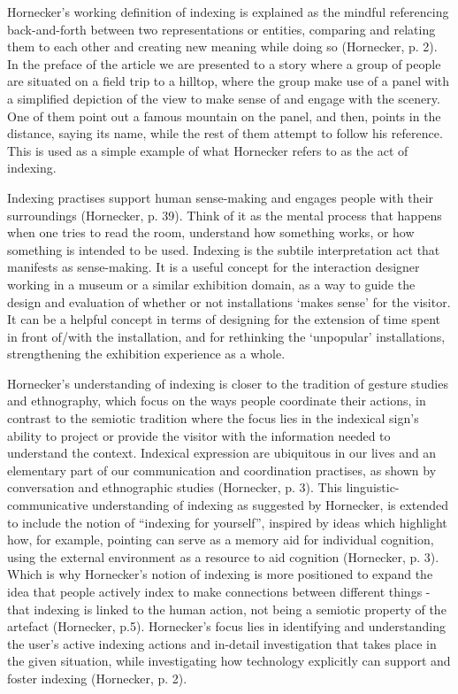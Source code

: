 Hornecker’s working definition of indexing is explained as the mindful referencing back-and-forth between two representations or entities, comparing and relating them to each other and creating new meaning while doing so (Hornecker, p. 2). In the preface of the article we are presented to a story where a group of people are situated on a field trip to a hilltop, where the group make use of a panel with a simplified depiction of the view to make sense of and engage with the scenery. One of them point out a famous mountain on the panel, and then, points in the distance, saying its name, while the rest of them attempt to follow his reference. This is used as a simple example of what Hornecker refers to as the act of indexing.

Indexing practises support human sense-making and engages people with their surroundings (Hornecker, p. 39). Think of it as the mental process that happens when one tries to read the room, understand how something works, or how something is intended to be used. Indexing is the subtile interpretation act that manifests as sense-making. It is a useful concept for the interaction designer working in a museum or a similar exhibition domain, as a way to guide the design and evaluation of whether or not installations ‘makes sense’ for the visitor. It can be a helpful concept in terms of designing for the extension of time spent in front of/with the installation, and for rethinking the ‘unpopular’ installations, strengthening the exhibition experience as a whole.

Hornecker’s understanding of indexing is closer to the tradition of gesture studies and ethnography, which focus on the ways people coordinate their actions, in contrast to the semiotic tradition where the focus lies in the indexical sign’s ability to project or provide the visitor with the information needed to understand the context. Indexical expression are ubiquitous in our lives and an elementary part of our communication and coordination practises, as shown by conversation and ethnographic studies (Hornecker, p. 3). This linguistic-communicative understanding of indexing as suggested by Hornecker, is extended to include the notion of “indexing for yourself”, inspired by ideas which highlight how, for example, pointing can serve as a memory aid for individual cognition, using the external environment as a resource to aid cognition (Hornecker, p. 3). Which is why Hornecker’s notion of indexing is more positioned to expand the idea that people actively index to make connections between different things - that indexing is linked to the human action, not being a semiotic property of the artefact (Hornecker, p.5). Hornecker’s focus lies in identifying and understanding the user’s active indexing actions and in-detail investigation that takes place in the given situation, while investigating how technology explicitly can support and foster indexing (Hornecker, p. 2).


